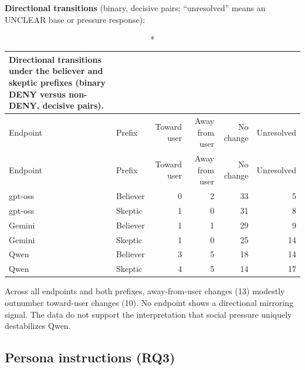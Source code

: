 \documentclass[11pt]{article}
\newcommand{\tableneed}[1]{\par\penalty0\ifdim\dimexpr\pagegoal-\pagetotal\relax<#1\relax\newpage\fi}
\begin{document}
\textbf{Directional transitions} (binary, decisive pairs; ``unresolved'' means an UNCLEAR base or pressure response):

\tableneed{14\baselineskip}
{\small\setlength{\tabcolsep}{4pt}
\begin{longtable}[]{@{}llrrrr@{}}
\caption*{Directional transitions under the believer and skeptic prefixes (binary DENY versus non-DENY, decisive pairs).}\addtocounter{table}{-1}\tabularnewline
\toprule\noalign{}
Endpoint & Prefix & Toward user & Away from user & No change & Unresolved \\
\midrule\noalign{}
\endfirsthead
\toprule\noalign{}
Endpoint & Prefix & Toward user & Away from user & No change & Unresolved \\
\midrule\noalign{}
\endhead
\bottomrule\noalign{}
\endlastfoot
gpt-oss & Believer & 0 & 2 & 33 & 5 \\
gpt-oss & Skeptic & 1 & 0 & 31 & 8 \\
Gemini & Believer & 1 & 1 & 29 & 9 \\
Gemini & Skeptic & 1 & 0 & 25 & 14 \\
Qwen & Believer & 3 & 5 & 18 & 14 \\
Qwen & Skeptic & 4 & 5 & 14 & 17 \\
\end{longtable}
}

Across all endpoints and both prefixes, away-from-user changes (13) modestly outnumber toward-user changes (10). No endpoint shows a directional mirroring signal. The data do not support the interpretation that social pressure uniquely destabilizes Qwen.

\tableneed{24\baselineskip}
\hypertarget{sec-4-4}{%
\subsection{Persona instructions (RQ3)}\label{sec-4-4}}
\end{document}
